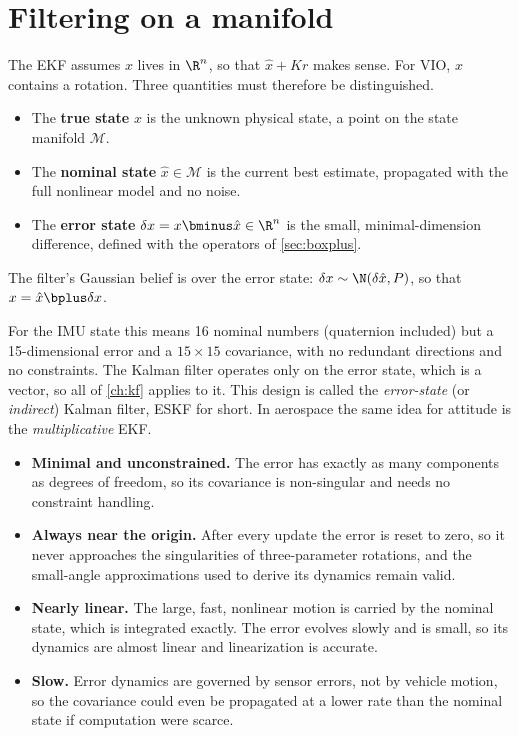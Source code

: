 \section{Filtering on a manifold}

The EKF assumes $x$ lives in $\R^n$, so that $\hat x + K r$ makes sense. For VIO, $x$ contains a rotation.
Three quantities must therefore be distinguished.

\begin{definition}
\begin{itemize}
  \item The \textbf{true state} $x$ is the unknown physical state, a point on the state manifold
        $\mathcal{M}$.
  \item The \textbf{nominal state} $\hat x \in \mathcal{M}$ is the current best estimate, propagated with the
        full nonlinear model and no noise.
  \item The \textbf{error state} $\delta x = x \bminus \hat x \in \R^{n}$ is the small, minimal-dimension
        difference, defined with the operators of \cref{sec:boxplus}.
\end{itemize}
The filter's Gaussian belief is over the error state: $\delta x \sim \N(\delta\hat x, P)$, so that
$x = \hat x \bplus \delta x$.
\end{definition}

For the IMU state this means 16 nominal numbers (quaternion included) but a 15-dimensional error and a
$15\times15$ covariance, with no redundant directions and no constraints. The Kalman filter operates only on
the error state, which is a vector, so all of \cref{ch:kf} applies to it. This design is called the
\emph{error-state} (or \emph{indirect}) Kalman filter, ESKF for short. In aerospace the same idea for
attitude is the \emph{multiplicative} EKF.

\begin{keyidea}
\begin{itemize}
  \item \textbf{Minimal and unconstrained.} The error has exactly as many components as degrees of
        freedom, so its covariance is non-singular and needs no constraint handling.
  \item \textbf{Always near the origin.} After every update the error is reset to zero, so it never
        approaches the singularities of three-parameter rotations, and the small-angle approximations
        used to derive its dynamics remain valid.
  \item \textbf{Nearly linear.} The large, fast, nonlinear motion is carried by the nominal state, which is
        integrated exactly. The error evolves slowly and is small, so its dynamics are almost linear and
        linearization is accurate.
  \item \textbf{Slow.} Error dynamics are governed by sensor errors, not by vehicle motion, so the covariance
        could even be propagated at a lower rate than the nominal state if computation were scarce.
\end{itemize}
\end{keyidea}

